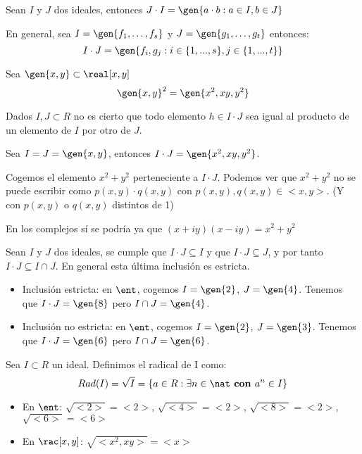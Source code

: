 \begin{defn}
	Sean $I$ y $J$ dos ideales, entonces $J\cdot I = \gen{a\cdot b: a \in I, b \in J}$

	En general, sea $I=\gen{f_1,\dotsc ,f_s}$ y $J=\gen{g_1,\dotsc,g_t}$ entonces:
	$$I\cdot J=\gen{ f_i, g_j: i \in \{1,...,s\}, j \in \{1,...,t\}}$$
\end{defn}

\begin{example} Sea $\gen{x,y} \subset \real[x,y]$
	$$\gen{x,y}^2 = \gen{x^2,xy,y^2}$$
\end{example}

\obs Dados $I,J \subset R$ no es cierto que todo elemento $h \in I\cdot J$ sea igual al producto de un elemento de $I$ por otro de $J$.

\begin{example}
	Sea $I=J=\gen{x,y}$, entonces $I\cdot J = \gen{x^2,xy,y^2}$.

	Cogemos el elemento $x^2 + y^2$ perteneciente a $I\cdot J$. Podemos ver que $x^2 + y^2$ no se puede escribir como $p(x,y) \cdot q(x,y)$ con $p(x,y),q(x,y) \in <x,y>$. (Y con $p(x,y)$ o $q(x,y)$ distintos de 1)

	\obs En los complejos sí se podría ya que $(x+iy)(x-iy)=x^2 + y^2$
\end{example}

\obs Sean $I$ y $J$ dos ideales, se cumple que $I\cdot J \subseteq I$ y que $I \cdot J \subseteq J$, y por tanto $I \cdot J \subseteq I \cap J$. En general esta última inclusión es estricta.

\begin{example}
	\begin{itemize}
\item Inclusión estricta: en $\ent$, cogemos $I=\gen{2}$, $J=\gen{4}$. Tenemos que $I\cdot J=\gen{8}$ pero $I\cap J=\gen{4}$.
\item Inclusión no estricta: en $\ent$, cogemos $I=\gen{2}$, $J=\gen{3}$. Tenemos que $I\cdot J=\gen{6}$ pero $I\cap J=\gen{6}$.
	\end{itemize}
\end{example}

\begin{defn}
Sea $I \subset R$ un ideal. Definimos el radical de I como:
$$Rad(I)=\sqrt{I}=\{a \in R: \exists n \in \nat \textbf{ con } a^n \in I \}$$
\end{defn}

\begin{example}
\begin{itemize}
	\item En $\ent$: $\sqrt{<2>}=<2>$, $\sqrt{<4>}=<2>$, $\sqrt{<8>}=<2>$, $\sqrt{<6>}=<6>$
	\item En $\rac[x,y]$: $\sqrt{<x^2,xy>}=<x>$
\end{itemize}
\end{example}


